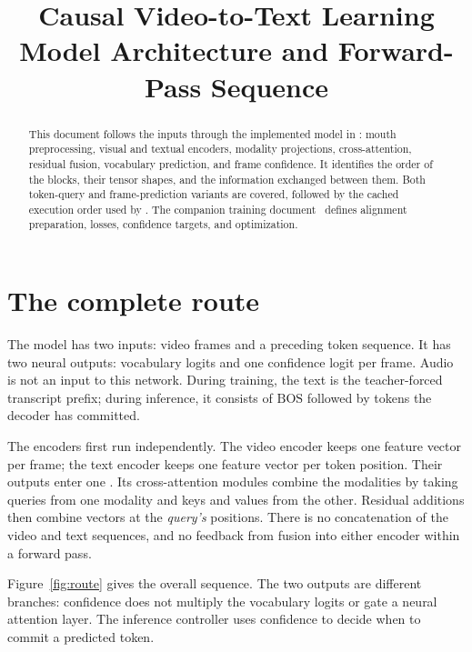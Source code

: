 \documentclass[11pt,a4paper]{article}
\title{Causal Video-to-Text Learning\\
\large Model Architecture and Forward-Pass Sequence}
\author{}
\date{}
\newcommand{\BOS}{\ensuremath{\mathrm{BOS}}}
\newcommand{\code}[1]{\texttt{\detokenize{#1}}}
\numberwithin{equation}{section}
\begin{document}
\maketitle
\vspace{-2em}

\begin{abstract}
This document follows the inputs through the implemented model in
\code{train.py}: mouth preprocessing, visual and textual encoders, modality
projections, cross-attention, residual fusion, vocabulary prediction, and
frame confidence. It identifies the order of the blocks, their tensor
shapes, and the information exchanged between them. Both token-query and
frame-prediction variants are covered, followed by the cached execution
order used by \code{infer.py}. The companion training document~\cite{training}
defines alignment preparation, losses, confidence targets, and optimization.
\end{abstract}

\section{The complete route}
\label{sec:overview}

The model has two inputs: video frames and a preceding token sequence.
It has two neural outputs: vocabulary logits and one confidence logit per
frame. Audio is not an input to this network. During training, the text is
the teacher-forced transcript prefix; during inference, it consists of
\BOS{} followed by tokens the decoder has committed.

The encoders first run independently. The video encoder keeps one feature
vector per frame; the text encoder keeps one feature vector per token
position. Their outputs enter one \code{MixedBlock}. Its cross-attention
modules combine the modalities by taking queries from one modality and
keys and values from the other. Residual additions then combine vectors
at the \emph{query's} positions. There is no concatenation of the video
and text sequences, and no feedback from fusion into either encoder
within a forward pass.

Figure~\ref{fig:route} gives the overall sequence. The two outputs are
different branches: confidence does not multiply the vocabulary logits
or gate a neural attention layer. The inference controller uses confidence
to decide when to commit a predicted token.
\end{document}
